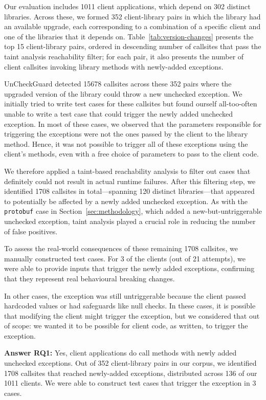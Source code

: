 Our evaluation includes 1011 client applications, which depend on 302 distinct libraries. Across these, we formed 352 client-library pairs in which the library had an available upgrade, each corresponding to a combination of a specific client and one of the libraries that it depends on. Table~\ref{tab:version-changes} presents the top 15 client-library pairs, ordered in descending number of callsites that pass the taint analysis reachability filter; for each pair, it also presents the number of client callsites invoking library methods with newly-added exceptions.

UnCheckGuard detected 15678 callsites across these 352 pairs where the upgraded version of the library could throw a new unchecked exception.
We initially tried to write test cases for these callsites but found ourself all-too-often unable to write a test case that could trigger
the newly added unchecked exception. In most of these cases, we observed that the parameters responsible for triggering the 
exceptions were not the ones passed by the client to the library method.
Hence, it was not possible to trigger all of these exceptions using the client's methods, even with a free choice of parameters to pass to the client code.

We therefore applied a taint-based reachability analysis to filter out cases that definitely could not result in actual runtime failures. After this filtering step, we identified 1708 callsites in total—spanning 120 distinct libraries—that appeared to potentially be affected by a newly added unchecked exception.
As with the \texttt{protobuf} case in Section~\ref{sec:methodology}, which added a new-but-untriggerable unchecked exception, taint analysis played a crucial role in reducing the number of false positives.

To assess the real-world consequences of these remaining 1708 callsites, we manually constructed test cases. For 3 of the clients (out of 21 attempts), we were able to provide inputs that trigger the newly added exceptions, confirming that they represent real behavioural breaking changes.

In other cases, the exception was still untriggerable because the client passed hardcoded values or had safeguards like null checks. In these cases, it is possible that modifying the client might trigger the exception, but we considered that out of scope: we wanted it to be possible for client code, as written, to trigger the exception.

\vspace{1em}
\begin{tcolorbox}[colback=gray!10, colframe=black]
\textbf{Answer RQ1:} Yes, client applications do call methods with newly added unchecked exceptions. Out of 352 client-library pairs in our corpus, we identified 1708 callsites that reached newly-added exceptions, distributed across 136 of our 1011 clients. We were able to construct test cases that trigger the exception in 3 cases.
\end{tcolorbox}
\vspace{1em}

